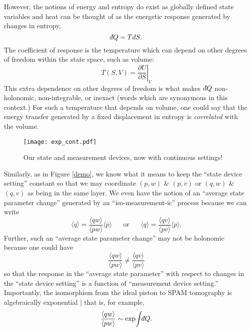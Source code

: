 \documentclass[pra, 10pt, notitlepage, twocolumn]{revtex4-1}
\def\dbar{{\mathchar'26\mkern-12mu d}}
\begin{document}
However, the notions of energy and entropy do exist as globally defined state variables and heat can be thought of as the energetic response generated by changes in entropy,
\begin{equation}
	\dbar Q = TdS.
\end{equation}
The coefficient of response is the temperature which can depend on other degrees of freedom within the state space, such as volume:
\begin{equation}
	T(S,V) = \left.\frac{\partial U}{\partial S}\right|_V
\end{equation}
This extra dependence on other degrees of freedom is what makes $\,\dbar Q$ non-holonomic, non-integrable, or inexact (words which are synonymous in this context.)
For such a temperature that depends on volume, one could say that the energy transfer generated by a fixed displacement in entropy is \emph{correlated} with the volume.


\begin{figure}[h!]
\centering
\texttt{[image: exp\_cont.pdf]}
\caption{
Our state and measurement devices, now with continuous settings!
}\label{cnobs}
\end{figure}


Similarly, as in Figure \ref{demo}, we know what it means to keep the ``state device setting'' constant so that we may coordinate $(p,w)$ \& $(p,v)$ or $(q,w)$ \& $(q,v)$ as being in the same layer.
We even have the notion of an ``average state parameter change'' generated by an ``iso-measurement-ic'' process because we can write
\begin{equation}
	\langle q \rangle = \frac{\langle q w \rangle}{\langle p w \rangle}\langle p \rangle
	\hspace{20pt}
	\text{or}
	\hspace{20pt}
	\langle q \rangle = \frac{\langle q v \rangle}{\langle p v \rangle}\langle p \rangle.
\end{equation}
Further, such an ``average state parameter change'' may not be holonomic because one could have
\begin{equation}
	\frac{\langle q w \rangle}{\langle p w \rangle}
	\neq
	\frac{\langle q v \rangle}{\langle p v \rangle}
\end{equation}
so that the response in the ``average state parameter'' with respect to changes in the ``state device setting'' is a function of ``measurement device setting.''
Importantly, the isomorphism from the ideal piston to SPAM tomography is algebraically exponential | that is, for example,
\begin{equation}
	\frac{\langle q w \rangle}{\langle p w \rangle}
	\sim
	\exp{\!\int\!\dbar Q}.
\end{equation}
\end{document}
